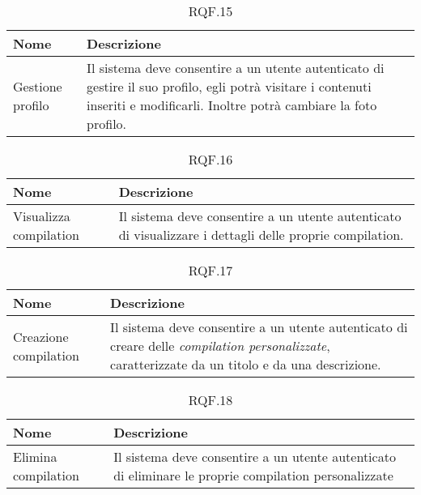 \documentclass{natourDoc}
\begin{document}
	\begin{table}[H]
		\centering
		\begin{tabular}{ |p{5cm}|p{10.3cm}| } 
			\hline
			\rowcolor{PineGreen!70}
			\textbf{Nome} & \textbf{Descrizione} \\
			\hline
			Gestione profilo &  Il sistema deve consentire a un utente autenticato di gestire il suo profilo, 
			egli potrà visitare i contenuti inseriti e modificarli. Inoltre potrà cambiare la foto profilo. \\
			\hline
		\end{tabular}
		\caption{RQF.15}
		\label{table:15}
	\end{table}
	

	\begin{table}[H]
		\centering
		\begin{tabular}{ |p{5cm}|p{10.3cm}| }
			\hline
			\rowcolor{PineGreen!70}
			\textbf{Nome} & \textbf{Descrizione} \\
			\hline
			Visualizza compilation & Il sistema deve consentire a un utente autenticato di visualizzare i dettagli
			delle proprie compilation.  \\
			\hline
		\end{tabular}
		\caption{RQF.16}
		\label{table:16}
	\end{table}

	\begin{table}[H]
		\centering
		\begin{tabular}{ |p{5cm}|p{10.3cm}| }
			\hline
			\rowcolor{PineGreen!70}
			\textbf{Nome} & \textbf{Descrizione} \\
			\hline
			Creazione compilation & Il sistema deve consentire a un utente autenticato di creare delle \textit{compilation personalizzate},
			caratterizzate da un titolo e da una descrizione. \\
			\hline
		\end{tabular}
		\caption{RQF.17}
		\label{table:17}
	\end{table}

	\begin{table}[H]
		\centering
		\begin{tabular}{ |p{5cm}|p{10.3cm}| }
			\hline
			\rowcolor{PineGreen!70}
			\textbf{Nome} & \textbf{Descrizione} \\
			\hline
			Elimina compilation & Il sistema deve consentire a un utente autenticato di eliminare le proprie
			compilation personalizzate \\
			\hline
		\end{tabular}
		\caption{RQF.18}
		\label{table:18}
	\end{table}
	
\end{document}
